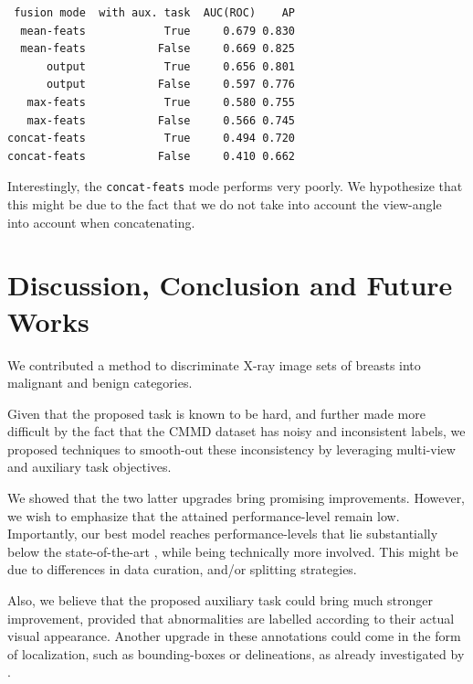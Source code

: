 \documentclass[11pt]{article}
\begin{document}
\begin{verbatim}
 fusion mode  with aux. task  AUC(ROC)    AP
  mean-feats            True     0.679 0.830
  mean-feats           False     0.669 0.825
      output            True     0.656 0.801
      output           False     0.597 0.776
   max-feats            True     0.580 0.755
   max-feats           False     0.566 0.745
concat-feats            True     0.494 0.720
concat-feats           False     0.410 0.662
\end{verbatim}


Interestingly, the \texttt{concat-feats} mode performs very poorly.
We hypothesize that this might be due to the fact
that we do not take into account the view-angle into account when
concatenating.

\section{Discussion, Conclusion and Future Works}
\label{sec:orgd8abe55}

We contributed a method to discriminate X-ray image sets of breasts into malignant and benign
categories.

Given that the proposed task is known to be hard, and further made more difficult by
the fact that the CMMD dataset has noisy and inconsistent labels,
we proposed techniques to smooth-out these inconsistency by leveraging multi-view and
auxiliary task objectives.

We showed that the two latter upgrades bring promising improvements.
However, we wish to emphasize that the attained performance-level remain low.
Importantly, our best model reaches performance-levels that lie substantially
below the state-of-the-art \autocite{tardy22}, while being technically more involved.
This might be due to differences in data curation, and/or splitting strategies.

Also, we believe that the proposed auxiliary task could bring much stronger
improvement, provided that abnormalities are labelled according to their actual
visual appearance. Another upgrade in these annotations could come in the form
of localization, such as bounding-boxes or delineations, as already investigated by \autocite{tang19}.



\printbibliography
\end{document}
